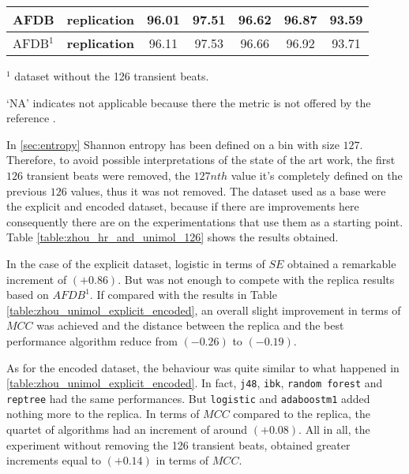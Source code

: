 \begin{table}[h]
\begin{center}
\begin{threeparttable}
\begin{tabular}{c c c c c c c}
  \hline
  AFDB & \textbf{replication} & 96.01 & 97.51 & 96.62 & 96.87 & 93.59 \\
  \hline
  AFDB$^1$ & \textbf{replication} & 96.11 & 97.53 & 96.66 & 96.92 & 93.71 \\
  \bottomrule
\end{tabular}
\begin{tablenotes}
	\item $^1$ dataset without the 126 transient beats.
 	\item ‘NA’ indicates not applicable because there the metric is not offered by the reference \cite{zhou2015}.
    \end{tablenotes}
\end{threeparttable}
\end{center}
\end{table}
In \ref{sec:entropy} Shannon entropy has been defined on a bin with size $127$. Therefore, to avoid possible interpretations of the state of the art work, the first $126$ transient beats were removed, the $127nth$ value it's completely defined on the previous $126$ values, thus it was not removed. The dataset used as a base were the explicit and encoded dataset, because if there are improvements here consequently there are on the experimentations that use them as a starting point. Table \ref{table:zhou_hr_and_unimol_126} shows the results obtained.

In the case of the explicit dataset, logistic in terms of $SE$ obtained a remarkable increment of $(+0.86)$. But was not enough to compete with the replica results based on $AFDB^1$. If compared with the results in Table \ref{table:zhou_unimol_explicit_encoded}, an overall slight improvement in terms of $MCC$ was achieved and the distance between the replica and the best performance algorithm reduce from $(-0.26)$ to  $(-0.19)$.

As for the encoded dataset, the behaviour was quite similar to what happened in \ref{table:zhou_unimol_explicit_encoded}. In fact, \verb|j48|, \verb|ibk|, \verb|random forest| and \verb|reptree| had the same performances. But \verb|logistic| and \verb|adaboostm1| added nothing more to the replica. In terms of $MCC$ compared to the replica, the quartet of algorithms had an increment of around $(+0.08)$. All in all, the experiment without removing the 126 transient beats, obtained greater increments equal to $(+0.14)$ in terms of $MCC$.

